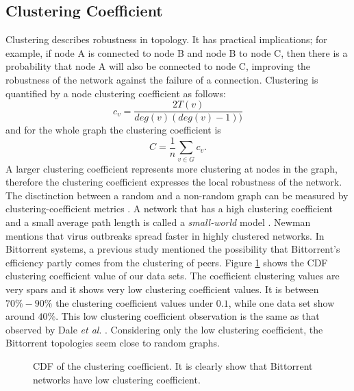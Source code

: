 \documentclass[10pt,conference,letterpaper]{IEEEtran}
\begin{document}
\subsection{Clustering Coefficient}\label{clusteringcoef}

Clustering describes robustness in topology. 
It has practical implications; for example, if node A is connected to node B and node B to node C, then there is a probability that node A will also be
connected to node C, improving the robustness of the network against the failure of a connection.  
Clustering is quantified by a node clustering coefficient as follows:
\begin{equation}
c_v = \frac{2T(v)}{deg(v) (deg(v)-1))}
\end{equation} 
and for the whole graph the clustering coefficient is
\begin{equation}
C = \frac{1}{n} \sum_{v \in G} c_v.
\end{equation}
A larger clustering coefficient represents more clustering at nodes in the graph, therefore the clustering coefficient expresses the local robustness of the network.
The disctinction between a random and a non-random graph can be measured by clustering-coefficient metrics \cite{watts1998collective}.
A network that has a high clustering coefficient and a small average path length is called a \textit{small-world} model \cite{watts1998collective}.
Newman \cite{newman2003properties} mentions that virus outbreaks spread faster in highly clustered networks. 
In Bittorrent systems, a previous study \cite{legout2007clustering} mentioned the possibility that Bittorrent's efficiency partly comes from the clustering of peers.
Figure \ref{fig:cdf-clustering} shows the CDF clustering coefficient value of our data sets.
The coefficient clustering values are very spars and it shows very low clustering coefficient values. 
It is between $70\% - 90\%$ the clustering coefficient values under $0.1$, while one data set show around $40\%$. 
This low clustering coefficient observation is the same as that observed by Dale \textit{et al}. \cite{dale2008evolution}.
Considering only the low clustering coefficient, the Bittorrent topologies seem close to random graphs.
\begin{figure}
\centering
{}
\caption{CDF of the clustering coefficient. It is clearly show that Bittorrent networks have low clustering coefficient.} 
\label{fig:cdf-clustering}
\vspace{-2mm}
\end{figure}
\end{document}
